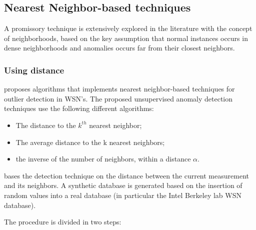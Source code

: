 \subsection{Nearest Neighbor-based techniques}

\label{sec:nnbased}



A promissory technique is extensively explored in the literature with the concept of neighborhoods, based on the key assumption that normal instances occurs in dense neighborhoods and anomalies occurs far from their closest neighbors.





\subsubsection{Using distance}



\cite{class:branch:2006} proposes algorithms that implements nearest neighbor-based techniques for outlier detection in WSN's. The proposed unsupervised anomaly detection techniques use the following different algorithms:



\begin{itemize}
	
	\setlength\itemsep{-0.5em}
	
	\item The distance to the $k^{th}$ nearest neighbor;
	
	\item The average distance to the k nearest neighbors;
	
	\item the inverse of the number of neighbors, within a distance $\alpha$.	
	
\end{itemize}



\cite{nn:abid:2016} bases the detection technique on the distance between the current measurement and its neighbors. A synthetic database is generated based on the insertion of random values into a real database (in particular the Intel Berkeley lab WSN database).

The procedure is divided in two steps: 


